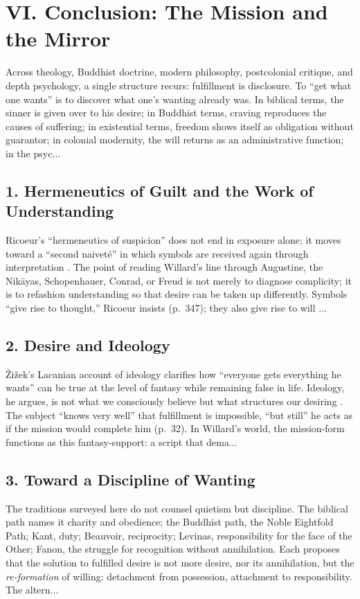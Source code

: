 \section*{VI. Conclusion: The Mission and the Mirror}
\label{sec:vi-conclusion-the-mission-and-the-mirror}

Across theology, Buddhist doctrine, modern philosophy, postcolonial critique, and depth psychology, a single structure recurs: fulfillment is disclosure. To ``get what one wants'' is to discover what one’s wanting already was. In biblical terms, the sinner is given over to his desire; in Buddhist terms, craving reproduces the causes of suffering; in existential terms, freedom shows itself as obligation without guarantor; in colonial modernity, the will returns as an administrative function; in the psyc...
\subsection*{1. Hermeneutics of Guilt and the Work of Understanding}
\label{ssec:1-hermeneutics-of-guilt-and-the-work-of-understanding}
Ricoeur’s ``hermeneutics of suspicion'' does not end in exposure alone; it moves toward a ``second naivet{\'e}'' in which symbols are received again through interpretation \parencite{RicoeurSymbol1970}. The point of reading Willard’s line through Augustine, the Nik{\={a}}yas, Schopenhauer, Conrad, or Freud is not merely to diagnose complicity; it is to refashion understanding so that desire can be taken up differently. Symbols ``give rise to thought,'' Ricoeur insists (p.~347); they also give rise to will ...
\subsection*{2. Desire and Ideology}
\label{ssec:2-desire-and-ideology}
{\v{Z}}i{\v{z}}ek’s Lacanian account of ideology clarifies how ``everyone gets everything he wants'' can be true at the level of fantasy while remaining false in life. Ideology, he argues, is not what we consciously believe but what structures our desiring \parencite{ZizekSublime1999}. The subject ``knows very well'' that fulfillment is impossible, ``but still'' he acts as if the mission would complete him (p.~32). In Willard’s world, the mission-form functions as this fantasy-support: a script that dema...
\subsection*{3. Toward a Discipline of Wanting}
\label{ssec:3-toward-a-discipline-of-wanting}
The traditions surveyed here do not counsel quietism but discipline. The biblical path names it charity and obedience; the Buddhist path, the Noble Eightfold Path; Kant, duty; Beauvoir, reciprocity; Levinas, responsibility for the face of the Other; Fanon, the struggle for recognition without annihilation. Each proposes that the solution to fulfilled desire is not more desire, nor its annihilation, but the \emph{re-formation} of willing: detachment from possession, attachment to responsibility. The altern...
